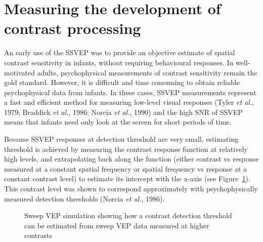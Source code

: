 \documentclass[
  letterpaper,
  DIV=11,
  numbers=noendperiod]{scrartcl}
\begin{document}
\section{Measuring the development of contrast
processing}\label{measuring-the-development-of-contrast-processing}

An early use of the SSVEP was to provide an objective estimate of
spatial contrast sensitivity in infants, without requiring behavioural
responses. In well-motivated adults, psychophysical measurements of
contrast sensitivity remain the gold standard. However, it is difficult
and time consuming to obtain reliable psychophysical data from infants.
In these cases, SSVEP measurements represent a fast and efficient method
for measuring low-level visual responses (Tyler \emph{et al.}, 1979;
Braddick \emph{et al.}, 1986; Norcia \emph{et al.}, 1990) and the high
SNR of SSVEP means that infants need only look at the screen for short
periods of time.

Because SSVEP responses at detection threshold are very small,
estimating threshold is achieved by measuring the contrast response
function at relatively high levels, and extrapolating back along the
function (either contrast vs response measured at a constant spatial
frequency or spatial frequency vs response at a constant contrast level)
to estimate its intercept with the x-axis (see
Figure~\ref{fig-sweepvep}). This contrast level was shown to correspond
approximately with psychophysically measured detection thresholds
(Norcia \emph{et al.}, 1986).

\begin{figure}


\caption{\label{fig-sweepvep}Sweep VEP simulation showing how a contrast
detection threshold can be estimated from sweep VEP data measured at
higher contrasts}

\end{figure}%
\end{document}
